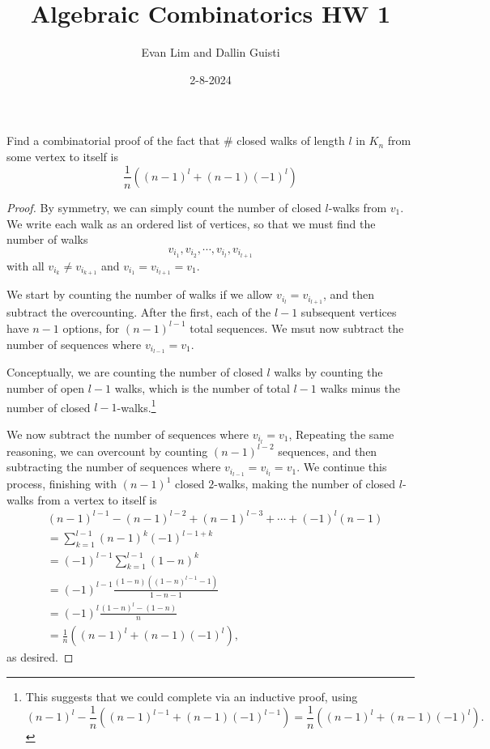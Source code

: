 \documentclass[11pt]{scrartcl}
\title{Algebraic Combinatorics HW 1}
\author{Evan Lim and Dallin Guisti}
\date{2-8-2024}
\begin{document}
\maketitle
\setcounter{section}{1}
\begin{problem}[\textcolor{red}{Closed Walks in $K_n$}]
    Find a combinatorial proof of the fact that $\#$ closed walks of length $l$ in $K_n$ from some vertex to itself is \[\frac{1}{n}\left((n-1)^l+(n-1)(-1)^l\right)\]
\end{problem}
\begin{proof}
    By symmetry, we can simply count the number of closed $l$-walks from $v_1$. We write each walk as an ordered list of vertices, so that we must find the number of walks 
    \[v_{i_1},v_{i_2},\cdots,v_{i_{l}},v_{i_{l+1}}\] with all $v_{i_k}\neq v_{i_{k+1}}$ and $v_{i_1}=v_{i_{l+1}}= v_1$. 
    
    We start by counting the number of walks if we allow $v_{i_l}=v_{i_{l+1}}$, and then subtract the overcounting. After the first, each of the $l-1$ subsequent vertices have $n-1$ options, for $(n-1)^{l-1}$ total sequences. We msut now subtract the number of sequences where $v_{i_{l-1}}=v_1$. 
    
    Conceptually, we are counting the number of closed $l$ walks by counting the number of open $l-1$ walks, which is the number of total $l-1$ walks minus the number of closed $l-1$-walks.\footnote{This suggests that we could complete via an inductive proof, using \[(n-1)^{l}-\frac{1}{n}\left((n-1)^{l-1}+(n-1)(-1)^{l-1}\right)=\frac{1}{n}\left((n-1)^{l}+(n-1)(-1)^l\right).\]}
    
    We now subtract the number of sequences where $v_{i_{l}}=v_1$, 
    Repeating the same reasoning, we can overcount by counting $(n-1)^{l-2}$ sequences, and then subtracting the number of sequences where $v_{i_{l-1}}=v_{i_l}=v_1$. We continue this process, finishing with $(n-1)^1$ closed $2$-walks, making the number of closed $l$-walks from a vertex to itself is
    \begin{align*}
        &(n-1)^{l-1}-(n-1)^{l-2}+(n-1)^{l-3}+\cdots+(-1)^l(n-1)\\
        &=\sum_{k=1}^{l-1}(n-1)^k(-1)^{l-1+k}\\
        &=(-1)^{l-1}\sum_{k=1}^{l-1}(1-n)^k\\
        &=(-1)^{l-1}\frac{(1-n)\left((1-n)^{l-1}-1\right)}{1-n-1}\\
        &=(-1)^{l}\frac{(1-n)^{l}-(1-n)}{n}\\
        &=\frac{1}{n}\left((n-1)^l+(n-1)(-1)^l\right),
    \end{align*}
    as desired.
\end{proof}
\end{document}
